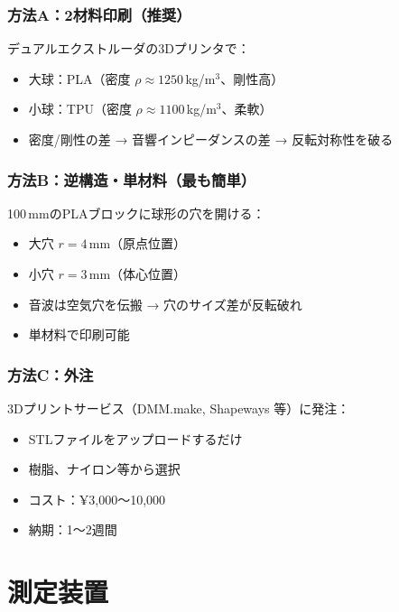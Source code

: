 \documentclass[11pt,a4paper]{article}
\begin{document}
\subsubsection{方法A：2材料印刷（推奨）}

デュアルエクストルーダの3Dプリンタで：
\begin{itemize}
\item 大球：PLA（密度 $\rho \approx 1250$\,kg/m$^3$、剛性高）
\item 小球：TPU（密度 $\rho \approx 1100$\,kg/m$^3$、柔軟）
\item 密度/剛性の差 → 音響インピーダンスの差 → 反転対称性を破る
\end{itemize}

\subsubsection{方法B：逆構造・単材料（最も簡単）}

100\,mmのPLAブロックに球形の穴を開ける：
\begin{itemize}
\item 大穴 $r = 4$\,mm（原点位置）
\item 小穴 $r = 3$\,mm（体心位置）
\item 音波は空気穴を伝搬 → 穴のサイズ差が反転破れ
\item 単材料で印刷可能
\end{itemize}

\subsubsection{方法C：外注}

3Dプリントサービス（DMM.make, Shapeways 等）に発注：
\begin{itemize}
\item STLファイルをアップロードするだけ
\item 樹脂、ナイロン等から選択
\item コスト：¥3,000〜10,000
\item 納期：1〜2週間
\end{itemize}

\section{測定装置}
\end{document}
